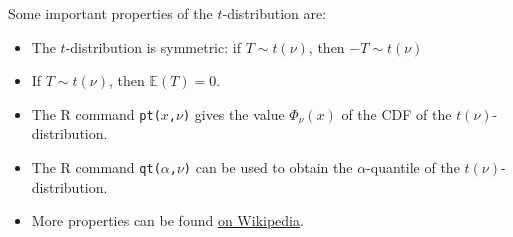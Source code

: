 \documentclass[
  a4paper,
]{article}
\theoremstyle{definition}
\theoremstyle{definition}
\theoremstyle{definition}
\theoremstyle{definition}
\theoremstyle{remark}
\begin{document}
Some important properties of the \(t\)-distribution are:

\begin{itemize}
\item
  The \(t\)-distribution is symmetric: if \(T \sim t(\nu)\), then
  \(-T \sim t(\nu)\)
\item
  If \(T\sim t(\nu)\), then \(\mathbb{E}(T) = 0\).
\item
  The R command \texttt{pt(\textbar{}}\(x\)\texttt{,}\(\nu\)\texttt{)} gives the value
  \(\Phi_\nu(x)\) of the CDF of the \(t(\nu)\)-distribution.
\item
  The R command \texttt{qt(}\(\alpha\)\texttt{,}\(\nu\)\texttt{)} can
  be used to obtain the
  \(\alpha\)-quantile of the \(t(\nu)\)-distribution.
\item
  More properties can be found
  \href{https://en.wikipedia.org/wiki/Student\%27s_t-distribution}{on Wikipedia}.
\end{itemize}

\clearpage
\end{document}
